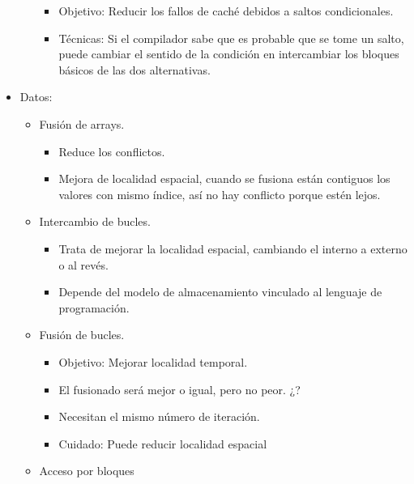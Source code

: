 \documentclass[12pt, twoside, openright]{report} %
\begin{document}
\begin{itemize}
\begin{itemize}
        \begin{itemize}
        
        \item
          Objetivo: Reducir los fallos de caché debidos a saltos
          condicionales.
        \item
          Técnicas: Si el compilador sabe que es probable que se tome un
          salto, puede cambiar el sentido de la condición en
          intercambiar los bloques básicos de las dos alternativas.
        \end{itemize}
      \end{itemize}
    \item
      Datos:

      \begin{itemize}
      \item
        Fusión de arrays.

        \begin{itemize}
        
        \item
          Reduce los conflictos.
        \item
          Mejora de localidad espacial, cuando se fusiona están
          contiguos los valores con mismo índice, así no hay conflicto
          porque estén lejos.
        \end{itemize}
      \item
        Intercambio de bucles.

        \begin{itemize}
        
        \item
          Trata de mejorar la localidad espacial, cambiando el interno a
          externo o al revés.
        \item
          Depende del modelo de almacenamiento vinculado al lenguaje de
          programación.
        \end{itemize}
      \item
        Fusión de bucles.

        \begin{itemize}
        
        \item
          Objetivo: Mejorar localidad temporal.
        \item
          El fusionado será mejor o igual, pero no peor. ¿?
        \item
          Necesitan el mismo número de iteración.
        \item
          Cuidado: Puede reducir localidad espacial
        \end{itemize}
      \item
        Acceso por bloques


\end{itemize}
\end{itemize}
\end{document}
